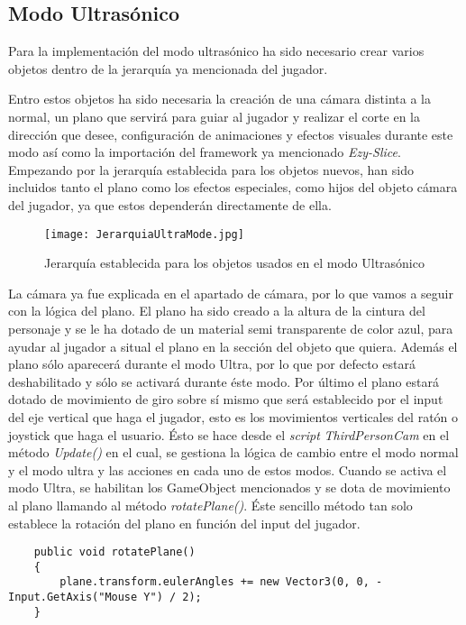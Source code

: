 \subsection{Modo Ultrasónico}

Para la implementación del modo ultrasónico ha sido necesario crear varios objetos dentro de la jerarquía ya mencionada del jugador. 

Entro estos objetos ha sido necesaria la creación de una cámara distinta a la normal, un plano que servirá para guiar al jugador y realizar el corte en la dirección que desee, configuración de animaciones y efectos visuales durante este modo así como la importación del framework ya mencionado \textit{Ezy-Slice}. Empezando por la jerarquía establecida para los objetos nuevos, han sido incluidos tanto el plano como los efectos especiales, como hijos del objeto cámara del jugador, ya que estos dependerán directamente de ella.

\begin{figure}[H]
    \centering
    \texttt{[image: JerarquiaUltraMode.jpg]}
    \caption{Jerarquía establecida para los objetos usados en el modo Ultrasónico}
\end{figure}

La cámara ya fue explicada en el apartado de cámara, por lo que vamos a seguir con la lógica del plano. El plano ha sido creado a la altura de la cintura del personaje y se le ha dotado de un material semi transparente de color azul, para ayudar al jugador a situal el plano en la sección del objeto que quiera. Además el plano sólo aparecerá durante el modo Ultra, por lo que por defecto estará deshabilitado y sólo se activará durante éste modo. Por último el plano estará dotado de movimiento de giro sobre sí mismo que será establecido por el input del eje vertical que haga el jugador, esto es los movimientos verticales del ratón o joystick que haga el usuario. Ésto se hace desde el \textit{script} \textit{ThirdPersonCam} en el método \textit{Update()} en el cual, se gestiona la lógica de cambio entre el modo normal y el modo ultra y las acciones en cada uno de estos modos. Cuando se activa el modo Ultra, se habilitan los GameObject mencionados y se dota de movimiento al plano llamando al método \textit{rotatePlane()}. Éste sencillo método tan solo establece la rotación del plano en función del input del jugador.

\begin{lstlisting}
    public void rotatePlane()
    {
        plane.transform.eulerAngles += new Vector3(0, 0, -Input.GetAxis("Mouse Y") / 2);
    }
\end{lstlisting}

